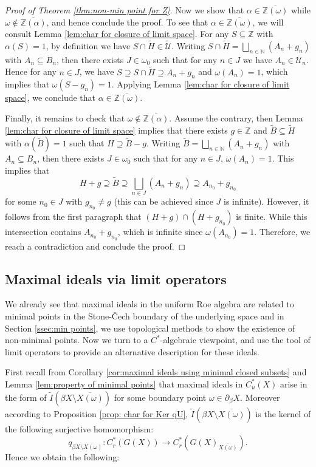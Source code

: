 \documentclass[12pt, a4paper]{amsart}
\numberwithin{equation}{section}
\theoremstyle{definition}
\theoremstyle{remark}
\def\NN{\mathbb{N}}
\def\ZZ{\mathbb{Z}}
\def\U{\mathcal{U}}
\begin{document}
\begin{proof}[Proof of Theorem \ref{thm:non-min point for Z}]
Now we show that $\alpha \in \overline{\ZZ(\omega)}$ while $\omega \notin \overline{\ZZ(\alpha)}$, and hence conclude the proof. To see that $\alpha \in \overline{\ZZ(\omega)}$, we will consult Lemma \ref{lem:char for closure of limit space}. For any $S \subseteq \ZZ$ with $\alpha(S)=1$, by definition we have $S \cap \widetilde{H} \in \widetilde{\U}$. Writing $S \cap \widetilde{H} = \bigsqcup_{n\in \NN}(A_n + g_n)$ with $A_n \subseteq B_n$, then there exists $J \in \omega_0$ such that for any $n\in J$ we have $A_n \in \U_n$. Hence for any $n \in J$, we have $S \supseteq S \cap \widetilde{H} \supseteq A_n + g_n$ and $\omega(A_n)=1$, which implies that $\omega(S - g_n)=1$. Applying Lemma \ref{lem:char for closure of limit space}, we conclude that $\alpha \in \overline{\ZZ(\omega)}$.

Finally, it remains to check that $\omega \notin \overline{\ZZ(\alpha)}$. Assume the contrary, then Lemma \ref{lem:char for closure of limit space} implies that there exists $g\in \ZZ$ and $\widetilde{B} \subseteq \widetilde{H}$ with $\alpha(\widetilde{B})=1$ such that $H \supseteq \widetilde{B} - g$. Writing $\widetilde{B} = \bigsqcup_{n\in \NN} (A_n + g_n)$ with $A_n \subseteq B_n$, then there exists $J \in \omega_0$ such that for any $n\in J$, $\omega(A_n) = 1$. This implies that
\[
H + g \supseteq \widetilde{B} \supseteq \bigsqcup_{n\in J} (A_n + g_n) \supseteq A_{n_0} + g_{n_0}
\]
for some $n_0 \in J$ with $g_{n_0} \neq g$ (this can be achieved since $J$ is infinite). However, it follows from the first paragraph that $(H + g) \cap (H + g_{n_0})$ is finite. While this intersection contains $A_{n_0} + g_{n_0}$, which is infinite since $\omega(A_{n_0}) =1$. Therefore, we reach a contradiction and conclude the proof.
\end{proof}




\subsection{Maximal ideals via limit operators}

We already see that maximal ideals in the uniform Roe algebra are related to minimal points in the Stone-\v{C}ech boundary of the underlying space and in Section \ref{ssec:min points}, we use topological methods to show the existence of non-minimal points. Now we turn to a $C^*$-algebraic viewpoint, and use the tool of limit operators to provide an alternative description for these ideals.

First recall from Corollary \ref{cor:maximal ideals using minimal closed subsets} and Lemma \ref{lem:property of minimal points} that maximal ideals in $C^*_u(X)$ arise in the form of $\tilde{I}(\beta X \setminus \overline{X(\omega)})$ for some boundary point $\omega \in \partial_\beta X$. Moreover according to Proposition \ref{prop: char for Ker qU}, $\tilde{I}(\beta X \setminus \overline{X(\omega)})$ is the kernel of the following surjective homomorphism:
\[
q_{\beta X \setminus \overline{X(\omega)}}:  C^*_r(G(X)) \longrightarrow C^*_r(G(X)_{\overline{X(\omega)}}).
\]
Hence we obtain the following:
\end{document}
